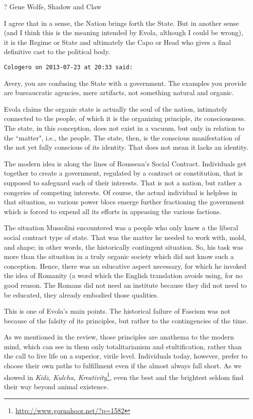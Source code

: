 \begin{footnotesize}
\begin{sffamily}
? Gene Wolfe, Shadow and Claw 

I agree that in a sense, the Nation brings forth the State. But in another sense (and I think this is the meaning intended by Evola, although I could be wrong), it is the Regime or State and ultimately the Capo or Head who gives a final definitive cast to the political body.


\hfill

\texttt{Cologero on 2013-07-23 at 20:33 said: }

Avery, you are confusing the State with a government. The examples you provide are bureaucratic agencies, mere artifacts, not something natural and organic.

Evola claims the organic state is actually the soul of the nation, intimately connected to the people, of which it is the organizing principle, its consciousness. The state, in this conception, does not exist in a vacuum, but only in relation to the ``matter", i.e., the people. The state, then, is the conscious manifestation of the not yet fully conscious of its identity. That does not mean it lacks an identity.

The modern idea is along the lines of Rousseau's Social Contract. Individuals get together to create a government, regulated by a contract or constitution, that is supposed to safeguard each of their interests. That is not a nation, but rather a congeries of competing interests. Of course, the actual individual is helpless in that situation, so various power blocs emerge further fractioning the government which is forced to expend all its efforts in appeasing the various factions.

The situation Mussolini encountered was a people who only knew a the liberal social contract type of state. That was the matter he needed to work with, mold, and shape; in other words, the historically contingent situation. So, his task was more than the situation in a truly organic society which did not know such a conception. Hence, there was an educative aspect necessary, for which he invoked the idea of Romanity (a word which the English translation avoids using, for no good reason. The Romans did not need an institute because they did not need to be educated, they already embodied those qualities.

This is one of Evola's main points. The historical failure of Fascism was not because of the falsity of its principles, but rather to the contingencies of the time.

As we mentioned in the review, those principles are anathema to the modern mind, which can see in them only totalitarianism and stultification, rather than the call to live life on a superior, virile level. Individuals today, however, prefer to choose their own paths to fulfillment even if the almost always fall short. As we showed in \textit{Kidz, Kulcha, Kreativity}\footnote{\url{http://www.gornahoor.net/?p=1582}}, even the best and the brightest seldom find their way beyond animal existence.



\end{sffamily}
\end{footnotesize}

